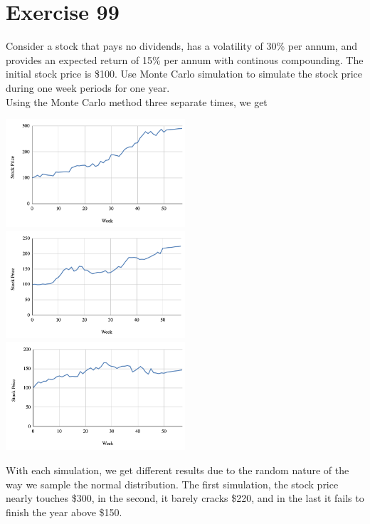 \documentclass{article}
\begin{document}
\section*{Exercise 99}
\begin{flushleft}
    Consider a stock that pays no dividends, has a volatility of 30\% per annum, and provides an expected return of 15\% per annum with continous compounding. The initial stock price is \$100. Use Monte Carlo simulation to simulate the stock price during one week periods for one year. \\
    Using the Monte Carlo method three separate times, we get
    \begin{center}
        \includegraphics[width=0.5\textwidth]{mc1.png}
        \includegraphics[width=0.5\textwidth]{mc2.png}
        \includegraphics[width=0.5\textwidth]{mc3.png}
    \end{center}
    With each simulation, we get different results due to the random nature of the way we sample the normal distribution. The first simulation, the stock price nearly touches \$300, in the second, it barely cracks \$220, and in the last it fails to finish the year above \$150.
\end{flushleft}
\end{document}
